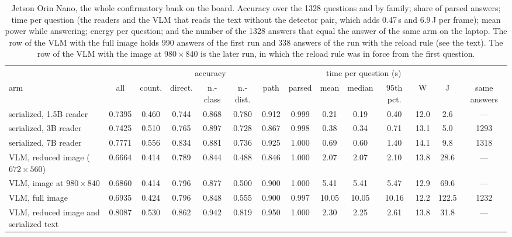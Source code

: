 \documentclass[10pt]{article}
\renewcommand{\thetable}{S\arabic{table}}
\newcommand{\fixtab}[1]{\renewcommand{\thetable}{#1}}
\begin{document}
\fixtab{S8b}\begin{table}[h]\centering\footnotesize
\caption{Jetson Orin Nano, the whole confirmatory bank on the board. Accuracy over the 1328 questions and by family; share of parsed answers; time per question (the readers and the VLM that reads the text without the detector pair, which adds 0.47\,s and 6.9\,J per frame); mean power while answering; energy per question; and the number of the 1328 answers that equal the answer of the same arm on the laptop. The row of the VLM with the full image holds 990 answers of the first run and 338 answers of the run with the reload rule (see the text). The row of the VLM with the image at $980\times840$ is the later run, in which the reload rule was in force from the first question.}\label{tab:s8b}
\setlength{\tabcolsep}{2.4pt}\begin{tabular}{@{}lccccccccccccc@{}}
\toprule
 & \multicolumn{7}{c}{accuracy} & \multicolumn{3}{c}{time per question (s)} & & & \\
arm & all & count. & direct. & n.-class & n.-dist. & path & parsed & mean & median & 95th pct. & W & J & same answers \\ \midrule
serialized, 1.5B reader & 0.7395 & 0.460 & 0.744 & 0.868 & 0.780 & 0.912 & 0.999 & 0.21 & 0.19 & 0.40 & 12.0 & 2.6 & --- \\
serialized, 3B reader & 0.7425 & 0.510 & 0.765 & 0.897 & 0.728 & 0.867 & 0.998 & 0.38 & 0.34 & 0.71 & 13.1 & 5.0 & 1293 \\
serialized, 7B reader & 0.7771 & 0.556 & 0.834 & 0.881 & 0.736 & 0.925 & 1.000 & 0.69 & 0.60 & 1.40 & 14.1 & 9.8 & 1318 \\
VLM, reduced image ($672\times560$) & 0.6664 & 0.414 & 0.789 & 0.844 & 0.488 & 0.846 & 1.000 & 2.07 & 2.07 & 2.10 & 13.8 & 28.6 & --- \\
VLM, image at $980\times840$ & 0.6860 & 0.414 & 0.796 & 0.877 & 0.500 & 0.900 & 1.000 & 5.41 & 5.41 & 5.47 & 12.9 & 69.6 & --- \\
VLM, full image & 0.6935 & 0.424 & 0.796 & 0.848 & 0.555 & 0.900 & 0.997 & 10.05 & 10.05 & 10.16 & 12.2 & 122.5 & 1232 \\
VLM, reduced image and serialized text & 0.8087 & 0.530 & 0.862 & 0.942 & 0.819 & 0.950 & 1.000 & 2.30 & 2.25 & 2.61 & 13.8 & 31.8 & --- \\
\bottomrule
\end{tabular}
\end{table}
\end{document}
